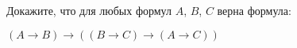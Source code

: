 
Докажите, что для любых формул $A$, $B$, $C$ верна формула:
\begin{center}
	$(A \rightarrow B) \rightarrow ((B \rightarrow C) \rightarrow (A
		\rightarrow C))$
\end{center}